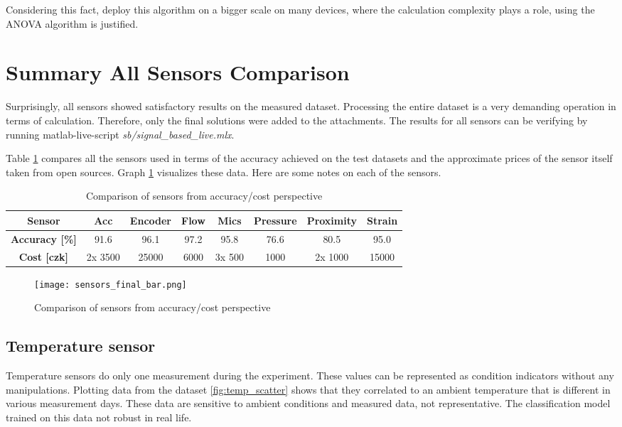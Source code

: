 Considering this fact, deploy this algorithm on a bigger scale on many
devices, where the calculation complexity plays a role, using the ANOVA
algorithm is justified.

\newpage
\section{Summary All Sensors Comparison}\label{sec:sensors_summary}

Surprisingly, all sensors showed satisfactory results on the measured
dataset.  Processing the entire dataset is a very demanding operation in
terms of calculation. Therefore, only the final solutions were added to the
attachments. The results for all sensors can be verifying by running
matlab-live-script \textit{sb/signal\_based\_live.mlx}.

Table \ref{tab:sensors_final} compares all the sensors used in terms of the
accuracy achieved on the test datasets and the approximate prices of the
sensor itself taken from open sources.  Graph \ref{fig:sensors_final_bar}
visualizes these data. Here are some notes on each of the sensors. 



\begin{table}[h]
    \centering
    \begin{tabular}{|c|c|c|c|c|c|c|c|}
        \hline
        \textbf{Sensor}   & Acc & Encoder & Flow & Mics & Pressure & Proximity & Strain \\
        \hline
        \textbf{Accuracy [\%]} & 91.6 & 96.1 & 97.2 & 95.8 & 76.6 & 80.5 & 95.0 \\
        \hline
        \textbf{Cost [czk]} & 2x 3500 & 25000 & 6000 & 3x 500 & 1000 & 2x 1000 & 15000 \\
        \hline
    \end{tabular}
    \caption{Comparison of sensors from accuracy/cost perspective}
    \label{tab:sensors_final}
\end{table}

\begin{figure}[h!]
    \centering
    \texttt{[image: sensors\_final\_bar.png]}
    \caption{Comparison of sensors from accuracy/cost perspective}
    \label{fig:sensors_final_bar}
\end{figure}

\subsection{Temperature sensor}
Temperature sensors do only one measurement during the experiment.  These
values can be represented as condition indicators without any
manipulations. Plotting data from the dataset \ref{fig:temp_scatter} shows
that they correlated to an ambient temperature that is different in various
measurement days. These data are sensitive to ambient conditions and
measured data, not representative. The classification model trained on this
data not robust in real life.


